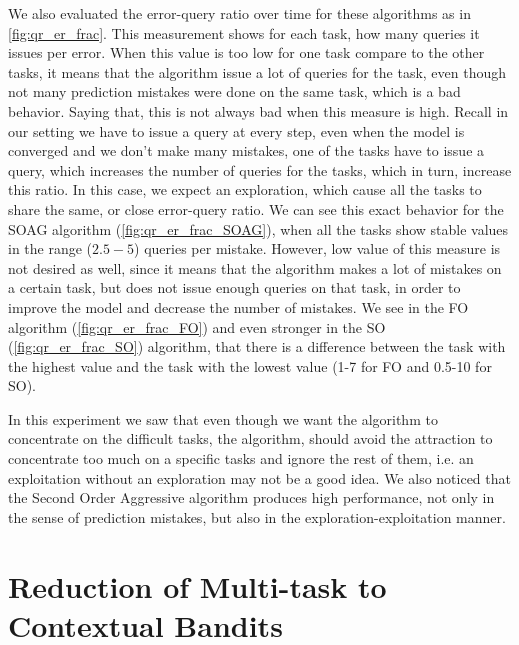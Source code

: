 We also evaluated the error-query ratio over time for these algorithms as in 
\eqref{fig:qr_er_frac}. This measurement shows for each task, how many queries 
it issues per error. When this value is too low for one task compare to the other tasks, it means that the algorithm 
issue a lot of queries for the task, even though not many prediction mistakes  
were done on the same task, which is a bad behavior. Saying that, this is not always bad when this 
measure is high. Recall in our setting we have to issue a query at every step, even when the model 
is converged and we don't make many mistakes, one of the tasks have to issue a query, which increases the 
number of queries for the tasks, which in turn, increase this ratio. In this case, we expect an 
exploration, which cause all the tasks to share 
the same, or close error-query ratio. We can see this exact behavior for the SOAG algorithm 
(\eqref{fig:qr_er_frac_SOAG}), when all the tasks show stable values in the 
range ($2.5-5$) queries per mistake. However, low value of this measure is not desired as well, since it 
means that the algorithm makes a lot of mistakes on a certain task, but does not 
issue enough queries on that task, in order to improve the model and decrease the number of 
mistakes. We see in the FO algorithm (\eqref{fig:qr_er_frac_FO}) and even stronger in the SO 
(\eqref{fig:qr_er_frac_SO}) algorithm, that there is a difference between the 
task with the highest value and the task with the lowest value (1-7 for FO and 0.5-10 for 
SO).

In this experiment we saw that even though we want the algorithm to concentrate on 
the difficult tasks, the algorithm, should avoid the attraction to concentrate too much on a specific 
tasks and ignore the rest of them, i.e. an exploitation without an exploration may not be a good 
idea. We also noticed that the Second Order Aggressive algorithm produces high 
performance, not only in the sense of prediction mistakes, but also in the 
exploration-exploitation manner.



\section{Reduction of Multi-task to Contextual Bandits}



